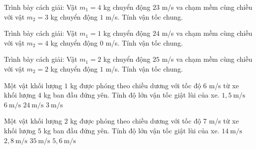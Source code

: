 \begin{bt}
Trình bày cách giải: Vật $m_1=4$ kg chuyển động $23$ m/s va chạm mềm cùng chiều với vật $m_2=3$ kg chuyển động $1$ m/s. Tính vận tốc chung.
\end{bt}

\begin{bt}
Trình bày cách giải: Vật $m_1=1$ kg chuyển động $24$ m/s va chạm mềm cùng chiều với vật $m_2=4$ kg chuyển động $0$ m/s. Tính vận tốc chung.
\end{bt}

\begin{bt}
Trình bày cách giải: Vật $m_1=2$ kg chuyển động $25$ m/s va chạm mềm cùng chiều với vật $m_2=2$ kg chuyển động $1$ m/s. Tính vận tốc chung.
\end{bt}

\begin{ex}
Một vật khối lượng $1$ kg được phóng theo chiều dương với tốc độ $6$ m/s từ xe khối lượng $4$ kg ban đầu đứng yên. Tính độ lớn vận tốc giật lùi của xe.
\choice
{\True $1,5\ \mathrm{m/s}$}
{$6\ \mathrm{m/s}$}
{$24\ \mathrm{m/s}$}
{$3\ \mathrm{m/s}$}
\end{ex}

\begin{ex}
Một vật khối lượng $2$ kg được phóng theo chiều dương với tốc độ $7$ m/s từ xe khối lượng $5$ kg ban đầu đứng yên. Tính độ lớn vận tốc giật lùi của xe.
\choice
{$14\ \mathrm{m/s}$}
{\True $2,8\ \mathrm{m/s}$}
{$35\ \mathrm{m/s}$}
{$5,6\ \mathrm{m/s}$}
\end{ex}

